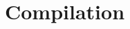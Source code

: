 \documentclass[12pt, phd, a4paper, oneside]{ucc_thesis}
\begin{document}
    \nobibliography*
    
    
    \chapter{Compilation}
        \label{chapterlabel2}
        

    
    
    
\end{document}
